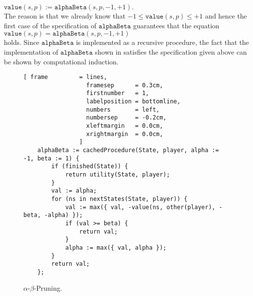 \\[0.2cm]
\hspace*{1.3cm}
$\texttt{value}(s, p ) := \texttt{alphaBeta}(s, p, -1, +1)$.
\\[0.2cm]
The reason is that we already know that $-1 \leq \texttt{value}(s,p) \leq +1$ and hence the first case of the
specification of $\texttt{alphaBeta}$ guarantees that the equation
\\[0.2cm]
\hspace*{1.3cm}
$\texttt{value}(s,p) = \texttt{alphaBeta}(s,p,-1,+1)$
\\[0.2cm]
holds.  Since $\texttt{alphaBeta}$ is implemented as a recursive procedure, 
the fact that the implementation of $\texttt{alphaBeta}$ shown in  satisfies the
specification given above can be shown by computational induction.  


\begin{figure}[!ht]
\centering
\begin{Verbatim}[ frame         = lines, 
                  framesep      = 0.3cm, 
                  firstnumber   = 1,
                  labelposition = bottomline,
                  numbers       = left,
                  numbersep     = -0.2cm,
                  xleftmargin   = 0.0cm,
                  xrightmargin  = 0.0cm,
                ]
    alphaBeta := cachedProcedure(State, player, alpha := -1, beta := 1) {
        if (finished(State)) {
            return utility(State, player);
        }
        val := alpha;
        for (ns in nextStates(State, player)) {
            val := max({ val, -value(ns, other(player), -beta, -alpha) });
            if (val >= beta) {
                return val;
            }
            alpha := max({ val, alpha });
        }
        return val;
    };
\end{Verbatim}
\vspace*{-0.3cm}
\caption{$\alpha$-$\beta$-Pruning.}
\label{fig:game-alpha-beta.stlx}
\end{figure}

